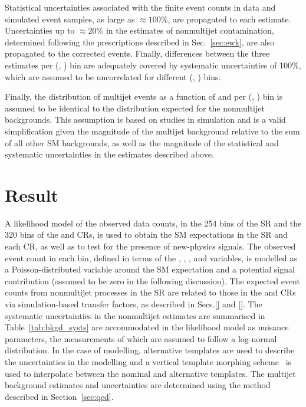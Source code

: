 Statistical uncertainties associated with the finite event counts in
data and simulated event samples, as large as ${\approx}100\%$, are
propagated to each estimate. Uncertainties up to ${\approx}20\%$ in
the estimates of nonmultijet contamination, determined following the
prescriptions described in Sec.~\ref{sec:ewk}, are also propagated to
the corrected events. Finally, differences between the three estimates
per (\njet, \scalht) bin are adequately covered by systematic
uncertainties of 100\%, which are assumed to be uncorrelated for
different (\njet, \scalht) bins.

Finally, the distribution of multijet events as a function of \nb and
\mht per (\njet, \scalht) bin is assumed to be identical to the
distribution expected for the nonmultijet backgrounds. This assumption
is based on studies in simulation %
and is a valid simplification given the magnitude of the multijet
background relative to the sum of all other SM backgrounds, as well as
the magnitude of the statistical and systematic uncertainties in the
estimates described above.


\section{Result}
\label{sec:result}

A likelihood model of the observed data counts, in the 254 bins of the
SR and the 320 bins of the \mj and \mmj CRs, is used to obtain the SM
expectations in the SR and each CR, as well as to test for the
presence of new-physics signals. The observed event count in each bin,
defined in terms of the \njet, \nb, \scalht, and \mht variables, is
modelled as a Poisson-distributed variable around the SM expectation
and a potential signal contribution (assumed to be zero in the
following discussion). The expected event counts from nonmultijet
processes in the SR are related to those in the \mj and \mmj CRs via
simulation-based transfer factors, as described in Secs.\ref{} and
\ref{}. The systematic uncertainties in the nonmultijet estimates are
summarised in Table~\ref{tab:bkgd_systs} are accommodated in the
likelihood model as nuisance parameters, the measurements of which are
assumed to follow a log-normal distribution. In the case of \mht
modelling, alternative templates are used to describe the
uncertainties in the \mht modelling and a vertical template morphing
scheme~\cite{Prosper:2011zz, RA1Paper2015} is used to interpolate
between the nominal and alternative templates. The multijet background
estimates and uncertainties are determined using the method described
in Section~\ref{sec:qcd}.

